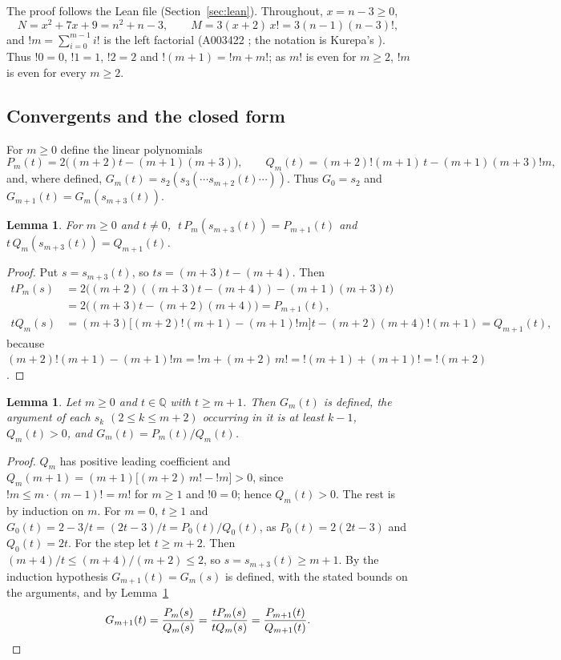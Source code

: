 \documentclass[11pt]{amsart}
\theoremstyle{plain}
\newtheorem{lemma}[theorem]{Lemma}
\theoremstyle{definition}
\newcommand{\Q}{\mathbb{Q}}
\newcommand{\lf}{\mathop{!}}
\begin{document}
The proof follows the Lean file  (Section~\ref{sec:lean}). Throughout, $x=n-3\ge0$,
\[
  N=x^2+7x+9=n^2+n-3,\qquad M=3(x+2)\,x!=3(n-1)(n-3)!,
\]
and $\lf m=\sum_{i=0}^{m-1}i!$ is the left factorial (A003422 \cite{A003422}; the notation is Kurepa's \cite{Kurepa}). Thus $\lf0=0$, $\lf1=1$, $\lf2=2$ and $\lf(m+1)=\lf m+m!$; as $m!$ is even for $m\ge2$, $\lf m$ is even for every $m\ge2$.

\subsection{Convergents and the closed form}
For $m\ge0$ define the linear polynomials
\[
  P_m(t)=2\bigl((m+2)t-(m+1)(m+3)\bigr),\qquad Q_m(t)=(m+2)\lf(m+1)\,t-(m+1)(m+3)\lf m,
\]
and, where defined, $G_m(t)=s_2(s_3(\cdots s_{m+2}(t)\cdots))$. Thus $G_0=s_2$ and $G_{m+1}(t)=G_m(s_{m+3}(t))$.

\begin{lemma}\label{lem:step}
For $m\ge0$ and $t\ne0$, $\;t\,P_m(s_{m+3}(t))=P_{m+1}(t)$ and $t\,Q_m(s_{m+3}(t))=Q_{m+1}(t)$.
\end{lemma}

\begin{proof}
Put $s=s_{m+3}(t)$, so $ts=(m+3)t-(m+4)$. Then
\begin{align*}
  tP_m(s)&=2\bigl((m+2)((m+3)t-(m+4))-(m+1)(m+3)t\bigr)\\
  &=2\bigl((m+3)t-(m+2)(m+4)\bigr)=P_{m+1}(t),\\
  tQ_m(s)&=(m+3)\bigl[(m+2)\lf(m+1)-(m+1)\lf m\bigr]t-(m+2)(m+4)\lf(m+1)=Q_{m+1}(t),
\end{align*}
because $(m+2)\lf(m+1)-(m+1)\lf m=\lf m+(m+2)\,m!=\lf(m+1)+(m+1)!=\lf(m+2)$.
\end{proof}

\begin{lemma}\label{lem:conv}
Let $m\ge0$ and $t\in\Q$ with $t\ge m+1$. Then $G_m(t)$ is defined, the argument of each $s_k$ $(2\le k\le m+2)$ occurring in it is at least $k-1$, $Q_m(t)>0$, and $G_m(t)=P_m(t)/Q_m(t)$.
\end{lemma}

\begin{proof}
$Q_m$ has positive leading coefficient and $Q_m(m+1)=(m+1)\bigl[(m+2)\,m!-\lf m\bigr]>0$, since $\lf m\le m\cdot(m-1)!=m!$ for $m\ge1$ and $\lf0=0$; hence $Q_m(t)>0$.
The rest is by induction on $m$. For $m=0$, $t\ge1$ and $G_0(t)=2-3/t=(2t-3)/t=P_0(t)/Q_0(t)$, as $P_0(t)=2(2t-3)$ and $Q_0(t)=2t$.
For the step let $t\ge m+2$. Then $(m+4)/t\le(m+4)/(m+2)\le2$, so $s=s_{m+3}(t)\ge m+1$. By the induction hypothesis $G_{m+1}(t)=G_m(s)$ is defined, with the stated bounds on the arguments, and by Lemma~\ref{lem:step}
\[
  G_{m+1}(t)=\frac{P_m(s)}{Q_m(s)}=\frac{tP_m(s)}{tQ_m(s)}=\frac{P_{m+1}(t)}{Q_{m+1}(t)}.\qedhere
\]
\end{proof}
\end{document}
